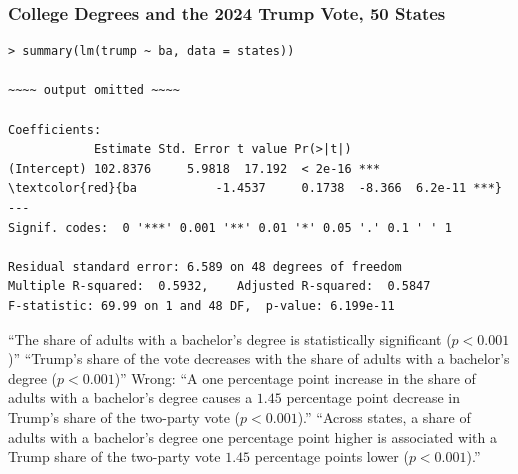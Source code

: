 \documentclass[xcolor=svgnames,9pt,english,aspectratio=169,t]{beamer}
\begin{document}
\begin{frame}[fragile]
\frametitle{College Degrees and the 2024 Trump Vote, 50 States}
{
\footnotesize
\begin{Verbatim}[frame=single, label=R Code, commandchars=\\\{\}]
> summary(lm(trump ~ ba, data = states))

~~~~ output omitted ~~~~

Coefficients:
            Estimate Std. Error t value Pr(>|t|)
(Intercept) 102.8376     5.9818  17.192  < 2e-16 ***
\textcolor{red}{ba           -1.4537     0.1738  -8.366  6.2e-11 ***}
---
Signif. codes:  0 '***' 0.001 '**' 0.01 '*' 0.05 '.' 0.1 ' ' 1

Residual standard error: 6.589 on 48 degrees of freedom
Multiple R-squared:  0.5932,	Adjusted R-squared:  0.5847
F-statistic: 69.99 on 1 and 48 DF,  p-value: 6.199e-11
\end{Verbatim}
}
\begin{overprint}
``The share of adults with a bachelor's degree is statistically significant ($p<0.001$)''
``Trump's share of the vote decreases with the share of adults with a bachelor's degree ($p<0.001$)''
\alert{Wrong:} ``A one percentage point increase in the share of adults with a bachelor's degree causes a $1.45$ percentage point decrease in Trump's share of the two-party vote ($p<0.001$).''
``Across states, a share of adults with a bachelor's degree one percentage point higher is associated with a Trump share of the two-party vote $1.45$ percentage points lower ($p<0.001$).''
\end{overprint}

\end{frame}


\end{document}
